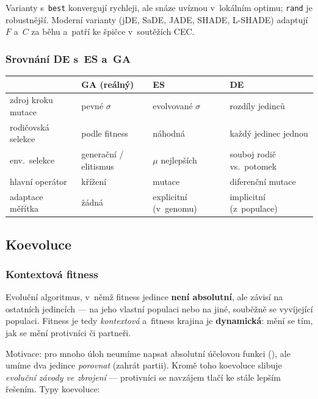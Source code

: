 \documentclass[11pt,a4paper]{article}
\theoremstyle{definition}
\begin{document}
Varianty s~\texttt{best} konvergují rychleji, ale snáze uvíznou v~lokálním
optimu; \texttt{rand} je robustnější. Moderní varianty (jDE, SaDE, JADE,
SHADE, L-SHADE) adaptují $F$ a~$C$ za běhu a~patří ke špičce v~soutěžích
CEC.

\subsubsection{Srovnání DE s~ES a~GA}

\begin{center}
\begin{tabular}{@{}p{3.2cm}p{3.7cm}p{3.7cm}p{3.7cm}@{}}
\toprule
 & \textbf{GA (reálný)} & \textbf{ES} & \textbf{DE} \\
\midrule
zdroj kroku mutace & pevné $\sigma$ & evolvované $\sigma$ & rozdíly jedinců \\
rodičovská selekce & podle fitness & náhodná & každý jedinec jednou \\
env.\ selekce & generační / elitismus & $\mu$ nejlepších & souboj rodič vs.\ potomek \\
hlavní operátor & křížení & mutace & diferenční mutace \\
adaptace měřítka & žádná & explicitní (v~genomu) & implicitní (z~populace) \\
\bottomrule
\end{tabular}
\end{center}

\subsection{Koevoluce}
\label{sec:koevoluce}
\subsubsection{Kontextová fitness}

\begin{defbox}
Evoluční algoritmus, v~němž fitness jedince \textbf{není absolutní}, ale závisí
na ostatních jedincích --- na jeho vlastní populaci nebo na jiné, souběžně se
vyvíjející populaci. Fitness je tedy \emph{kontextová} a~fitness krajina je
\textbf{dynamická}: mění se tím, jak se mění protivníci či partneři.
\end{defbox}

Motivace: pro mnoho úloh neumíme napsat absolutní účelovou funkci
(), ale umíme dva jedince \emph{porovnat}
(zahrát partii). Kromě toho koevoluce slibuje \emph{evoluční závody ve
zbrojení} --- protivníci se navzájem tlačí ke stále lepším řešením.
Typy koevoluce:
\end{document}

